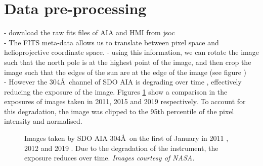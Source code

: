 \documentclass[11pt,a4paper,onecolumn]{report}
\begin{document}
\section{Data pre-processing}
\label{sec:Data prep}
- download the raw fits files of AIA and HMI from jsoc \\
- The FITS meta-data allows us to translate between pixel space and
helioprojective coordinate space. - using this information, we can rotate the
image such that the north pole is at the highest point of the image, and then
crop the image such that the edges of the sun are at the edge of the image (see
figure %
) \\

- However the 304\AA \ channel of SDO AIA is degrading over time
\cite{boerner_photometric_2014}, effectively reducing the exposure of the
image. Figures \ref{fig:aia_degradation} show a comparison in the exposures of
images taken in 2011, 2015 and 2019 respectively. To account for this
degradation, the image was clipped to the 95th percentile of the pixel
intensity and normalised.


\begin{figure}[t]%
  \centering
  \qquad
  \qquad
  \caption[]{Images taken by SDO AIA 304\AA \ on the first of January in 2011
    , 2012  and 2019
    . Due to the degradation of the instrument, the
    exposure reduces over time. \textit{Images courtesy of NASA.}}
  \label{fig:aia_degradation}
\end{figure}
\end{document}
